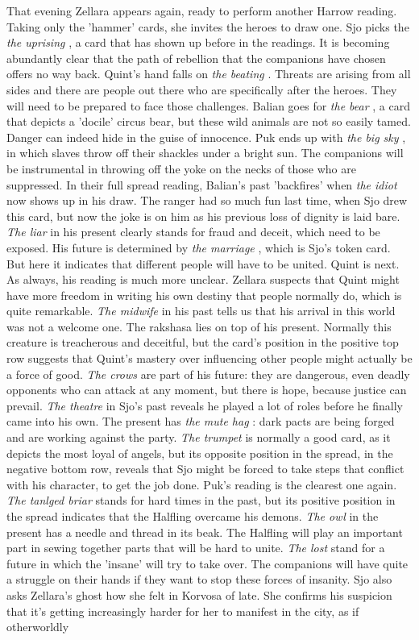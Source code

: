 That evening Zellara appears again, ready to perform another Harrow reading. Taking only the 'hammer' cards, she invites the heroes to draw one. Sjo picks the {\itshape the uprising} , a card that has shown up before in the readings. It is becoming abundantly clear that the path of rebellion that the companions have chosen offers no way back. Quint's hand falls on  {\itshape the beating} . Threats are arising from all sides and there are people out there who are specifically after the heroes. They will need to be prepared to face those challenges. Balian goes for  {\itshape the bear} , a card that depicts a 'docile' circus bear, but these wild animals are not so easily tamed. Danger can indeed hide in the guise of innocence. Puk ends up with  {\itshape the big sky} , in which slaves throw off their shackles under a bright sun. The companions will be instrumental in throwing off the yoke on the necks of those who are suppressed. In their full spread reading, Balian's past 'backfires' when {\itshape the idiot} now shows up in his draw. The ranger had so much fun last time, when Sjo drew this card, but now the joke is on him as his previous loss of dignity is laid bare.  {\itshape The liar} in his present clearly stands for fraud and deceit, which need to be exposed. His future is determined by  {\itshape the marriage} , which is Sjo's token card. But here it indicates that different people will have to be united. Quint is next. As always, his reading is much more unclear. Zellara suspects that Quint might have more freedom in writing his own destiny that people normally do, which is quite remarkable. {\itshape The midwife} in his past tells us that his arrival in this world was not a welcome one. The rakshasa lies on top of his present. Normally this creature is treacherous and deceitful, but the card's position in the positive top row suggests that Quint's mastery over influencing other people might actually be a force of good.  {\itshape The crows} are part of his future: they are dangerous, even deadly opponents who can attack at any moment, but there is hope, because justice can prevail.  {\itshape The theatre} in Sjo's past reveals he played a lot of roles before he finally came into his own. The present has  {\itshape the mute hag} : dark pacts are being forged and are working against the party.  {\itshape The trumpet} is normally a good card, as it depicts the most loyal of angels, but its opposite position in the spread, in the negative bottom row, reveals that Sjo might be forced to take steps that conflict with his character, to get the job done. Puk's reading is the clearest one again. {\itshape The tanlged briar} stands for hard times in the past, but its positive position in the spread indicates that the Halfling overcame his demons.  {\itshape The owl} in the present has a needle and thread in its beak. The Halfling will play an important part in sewing together parts that will be hard to unite.  {\itshape The lost} stand for a future in which the 'insane' will try to take over. The companions will have quite a struggle on their hands if they want to stop these forces of insanity. Sjo also asks Zellara's ghost how she felt in Korvosa of late. She confirms his suspicion that it's getting increasingly harder for her to manifest in the city, as if otherworldly 